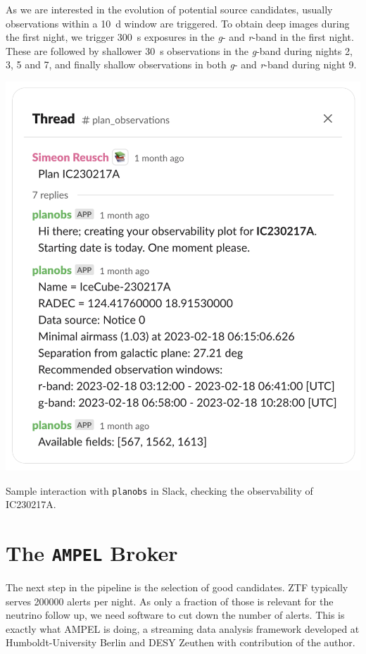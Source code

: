 \documentclass[
    a4paper, %
    fontsize=10pt, %
    twoside=true, %
    numbers=noenddot, %
    fontmethod=tex,
]{kaobook}
\begin{document}
As we are interested in the evolution of potential source candidates, usually observations within a \SI{10}{\day} window are triggered. To obtain deep images during the first night, we trigger \SI{300}{\second} exposures in the \textit{g}- and \textit{r}-band in the first night. These are followed by shallower \SI{30}{\second} observations in the \textit{g}-band during nights 2, 3, 5 and 7, and finally shallow observations in both \textit{g}- and \textit{r}-band during night 9.
\begin{marginfigure}
    \includegraphics{fu/planobs_slack_border.pdf}
    \caption[\texttt{planobs} Slack interaction]{Sample interaction with \texttt{planobs} in Slack, checking the observability of IC230217A.}
\end{marginfigure} 
\section{The \texttt{AMPEL} Broker} \label{ampel}
The next step in the pipeline is the selection of good candidates. ZTF typically serves 200000 alerts per night. As only a fraction of those is relevant for the neutrino follow up, we need software to cut down the number of alerts. This is exactly what AMPEL is doing, a streaming data analysis framework developed at Humboldt-University Berlin and DESY Zeuthen with contribution of the author.
\end{document}
